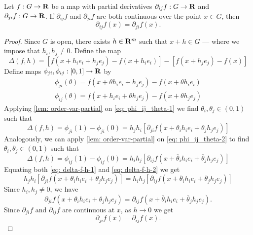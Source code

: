 \begin{theorem}
  \label{thm: order-var-partial}
  Let \(f: G \to \mathbf{R}\) be a map with partial derivatives \(\partial_{i j} f: G
  \to \mathbf{R}\) and \(\partial_{j i} f: G \to \mathbf{R}\). If \(\partial_{i j} f\) and
  \(\partial_{j i} f\) are both continuous over the point \(x \in G\), then
  \[
    \partial_{i j} f(x) = \partial_{j i} f(x).
  \]
\end{theorem}

\begin{proof}
  Since \(G\) is open, there exists \(h \in \mathbf{R}^m\) such that \(x + h \in G\) ---
  where we impose that \(h_i, h_j \neq 0\). Define the map
  \begin{equation}\label{eq: order-var-partial-1}
    \Delta(f, h) =
    [f(x + h_i e_i + h_j e_j) - f(x + h_i e_i)] - [f(x + h_j e_j) - f(x)]
  \end{equation}
  Define maps \(\phi_{ji}, \phi_{ij}: [0, 1] \to \mathbf{R}\) by
  \begin{gather}
    \label{eq: phi_ij_theta-1}
    \phi_{ji}(\theta) = f(x + \theta h_i e_i + h_j e_j) - f(x + \theta h_i e_i)
    \\
    \label{eq: phi_ij_theta-2}
    \phi_{ij}(\theta) = f(x + h_i e_i + \theta h_j e_j) - f(x + \theta h_j e_j)
  \end{gather}
  Applying \cref{lem: order-var-partial} on \cref{eq: phi_ij_theta-1} we find
  \(\theta_i, \theta_j \in (0, 1)\) such that
  \begin{equation}\label{eq: delta-f-h-1}
    \Delta(f, h) = \phi_{ji}(1) - \phi_{ji}(0)
    = h_j h_i [\partial_{ji} f(x + \theta_i h_i e_i + \theta_j h_j e_j)]
  \end{equation}
  Analogously, we can apply \cref{lem: order-var-partial} on \cref{eq:
  phi_ij_theta-2} to find \(\overline \theta_i, \overline \theta_j \in (0, 1)\)
  such that
  \begin{equation}\label{eq: delta-f-h-2}
    \Delta(f, h) = \phi_{ij}(1) - \phi_{ij}(0)
    = h_i h_j [\partial_{ij} f(x + \overline \theta_i h_i e_i + \overline
    \theta_j h_j e_j)]
  \end{equation}
  Equating both \cref{eq: delta-f-h-1} and \cref{eq: delta-f-h-2} we get
  \[
    h_j h_i [\partial_{ji} f(x + \theta_i h_i e_i + \theta_j h_j e_j)]
    = h_i h_j [\partial_{ij} f(x + \overline \theta_i h_i e_i + \overline
    \theta_j h_j e_j)]
  \]
  Since \(h_i, h_j \neq 0\), we have
  \[
    \partial_{ji} f(x + \theta_i h_i e_i + \theta_j h_j e_j)
    = \partial_{ij} f(x + \overline \theta_i h_i e_i + \overline \theta_j h_j
    e_j).
  \]
  Since \(\partial_{ji} f\) and \(\partial_{ij} f\) are continuous at \(x\), as
  \(h \to 0\) we get
  \[
    \partial_{ji} f(x) = \partial_{ij} f(x).
  \]
\end{proof}

